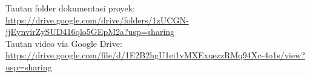 \documentclass[11pt, a4paper]{article}
\begin{document}
\begin{center}
\begin{tcolorbox}[colback=unidabg, colframe=unidaborder, boxrule=0.7pt, arc=4pt, left=10pt, right=10pt, top=8pt, bottom=8pt, width=0.95\textwidth]
\centering
\small\textcolor{unidagray}{Tautan folder dokumentasi proyek:} \\[0.15cm]
{\footnotesize\url{https://drive.google.com/drive/folders/1zUCGN-jjEynvirZySUD416qlo5GEpM2a?usp=sharing}}\\[0.3cm]
\small\textcolor{unidagray}{Tautan video via Google Drive:} \\[0.15cm]
{\footnotesize\url{https://drive.google.com/file/d/1E2B2hgU1ei1vMXExqezzRMq94Xc-4o1s/view?usp=sharing}}
\end{tcolorbox}
\end{center}
\end{document}
